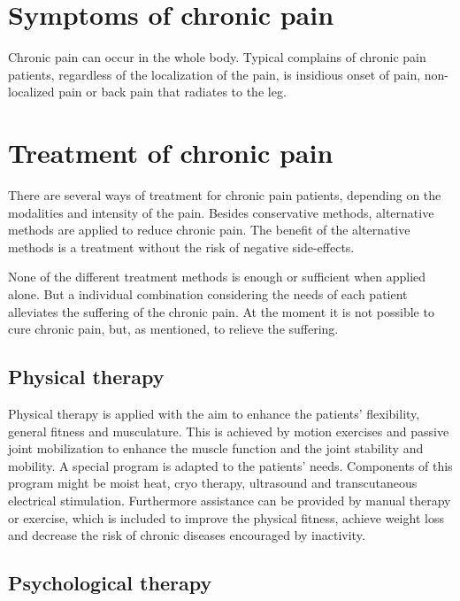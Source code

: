 \section{Symptoms of chronic pain}

Chronic pain can occur in the whole body. Typical complains of chronic pain patients, regardless of the localization of the pain, is insidious onset of pain, non-localized pain or back pain that radiates to the leg. \cite{marcus2009}

\section{Treatment of chronic pain}

There are several ways of treatment for chronic pain patients, depending on the modalities and intensity of the pain. Besides conservative methods, alternative methods are applied to reduce chronic pain. The benefit of the alternative methods is a treatment without the risk of negative side-effects. \cite{marcus2009,pope2017}

None of the different treatment methods is enough or sufficient when applied alone. But a individual combination considering the needs of each patient alleviates the suffering of the chronic pain.
At the moment it is not possible to cure chronic pain, but, as mentioned, to relieve the suffering. \cite{marcus2009,pope2017}

\subsection{Physical therapy}

Physical therapy is applied with the aim to enhance the patients' flexibility, general fitness and musculature. This is achieved by motion exercises and passive joint mobilization to enhance the muscle function and the joint stability and mobility. A special program is adapted to the patients' needs. Components of this program might be moist heat, cryo therapy, ultrasound and transcutaneous electrical stimulation. Furthermore assistance can be provided by manual therapy or exercise, which is included to improve the physical fitness, achieve weight loss and decrease the risk of chronic diseases encouraged by inactivity. \cite{marcus2009,pope2017}

\subsection{Psychological therapy}

